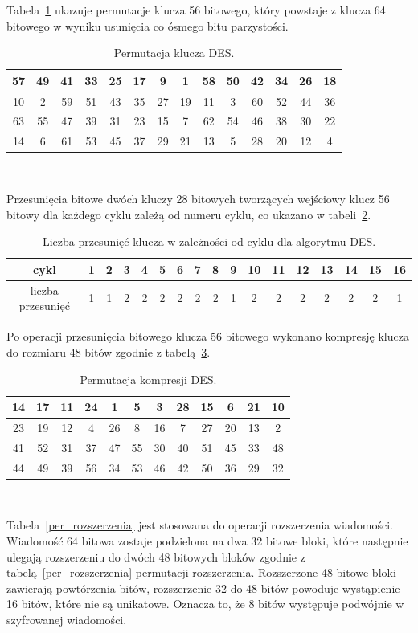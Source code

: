 \documentclass[12p]{article}
\begin{document}
Tabela~\ref{per_klucza} ukazuje permutacje klucza 56 bitowego, który powstaje z klucza 64 bitowego w wyniku usunięcia co ósmego bitu parzystości.%

\begin{table}[H]
\centering
\begin{tabular}{|c|c|c|c|c|c|c|c|c|c|c|c|c|c|}
\hline
57 & 49 & 41 & 33 & 25 & 17 & 9 & 1 & 58 & 50 & 42 & 34 & 26 & 18\\
\hline
10 & 2 & 59 & 51 & 43 & 35 & 27 & 19 & 11 & 3 & 60 & 52 & 44 & 36\\
\hline
63 & 55 & 47 & 39 & 31 & 23 & 15 & 7 & 62 & 54 & 46 & 38 & 30 & 22\\
\hline
14 & 6 & 61 & 53 & 45 & 37 & 29 & 21 & 13 & 5 & 28 & 20 & 12 & 4 \\
\hline
\end{tabular}
\caption{Permutacja klucza DES.}~\label{per_klucza}
\end{table}
 
Przesunięcia bitowe dwóch kluczy 28 bitowych tworzących wejściowy klucz 56 bitowy dla każdego cyklu zależą od numeru cyklu, co ukazano w tabeli~\ref{przesuniecie_klucza}.

\begin{table}[H]
\begin{tabular}{|c|c|c|c|c|c|c|c|c|c|c|c|c|c|c|c|c|}
\hline
cykl&1&2&3&4&5&6&7&8&9&10&11&12&13&14&15&16\\
\hline
liczba przesunięć&1&1&2&2&2&2&2&2&1&2&2&2&2&2&2&1\\ \hline
\end{tabular}
\caption{Liczba przesunięć klucza w zależności od cyklu dla algorytmu DES.}\label{przesuniecie_klucza}
\end{table} 
 
Po operacji przesunięcia bitowego klucza 56 bitowego wykonano kompresję klucza do rozmiaru 48 bitów zgodnie z tabelą~\ref{per_kompresji}.
 
\begin{table}[H]
\centering
\begin{tabular}{|c|c|c|c|c|c|c|c|c|c|c|c|}
\hline
14 & 17 & 11 & 24 & 1 & 5 & 3 & 28 & 15 & 6 & 21 & 10\\
\hline
23 & 19 & 12 & 4 & 26 & 8 & 16 & 7 & 27 & 20 & 13 & 2\\
\hline
41 & 52 & 31 & 37 & 47 & 55 & 30 & 40 & 51 & 45 & 33 & 48\\
\hline
44 & 49 & 39 & 56 & 34 & 53 & 46 & 42 & 50 & 36 & 29 & 32\\
\hline
\end{tabular}
\caption{Permutacja kompresji DES.}~\label{per_kompresji}
\end{table}
\newpage
Tabela~\ref{per_rozszerzenia} jest stosowana do operacji rozszerzenia wiadomości. Wiadomość 64 bitowa zostaje podzielona na dwa 32 bitowe bloki, które następnie ulegają rozszerzeniu do dwóch 48 bitowych bloków zgodnie z tabelą~\ref{per_rozszerzenia} permutacji rozszerzenia. Rozszerzone 48 bitowe bloki zawierają powtórzenia bitów, rozszerzenie 32 do 48 bitów powoduje wystąpienie 16 bitów, które nie są unikatowe. Oznacza to, że 8 bitów występuje podwójnie w szyfrowanej wiadomości.
\end{document}
